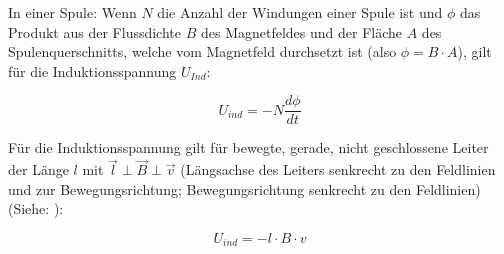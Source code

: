 In einer Spule: Wenn $N$ die Anzahl der Windungen einer Spule ist und $\phi$ das Produkt aus der Flussdichte $B$ des Magnetfeldes und der Fläche $A$ des Spulenquerschnitts, welche vom Magnetfeld durchsetzt ist (also $\phi = B \cdot A$), gilt für die Induktionsspannung $U_{Ind}$:

\begin{equation} \label{eq:InduGe}
	U_{ind} = -N \frac{d\phi}{dt}
\end{equation}

\noindent Für die Induktionsspannung gilt für bewegte, gerade, nicht geschlossene Leiter der Länge $l$ mit $\vec{l} \perp \vec{B} \perp \vec{v}$ (Längsachse des Leiters senkrecht zu den Feldlinien und zur Bewegungsrichtung; Bewegungsrichtung senkrecht zu den Feldlinien)(Siehe: ):

\begin{equation}
	U_{ind} = -l \cdot B \cdot v
\end{equation}